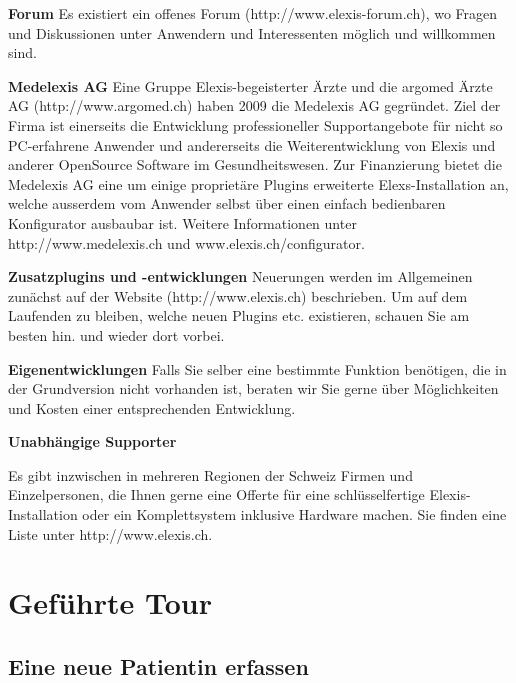 \documentclass[paper=a4,BCOR8.25mm,twoside]{scrbook}
\begin{document}
\bigskip

\textbf{Forum}
Es existiert ein offenes Forum (http://www.elexis-forum.ch), wo Fragen und Diskussionen unter Anwendern und Interessenten möglich und willkommen sind.

\bigskip

\textbf{Medelexis AG}
Eine Gruppe Elexis-begeisterter Ärzte und die argomed Ärzte AG (http://www.argomed.ch) haben 2009 die Medelexis AG gegründet. Ziel der Firma ist einerseits die Entwicklung professioneller Supportangebote für nicht so PC-erfahrene Anwender und andererseits die Weiterentwicklung von Elexis und anderer OpenSource Software im Gesundheitswesen. Zur Finanzierung bietet die Medelexis AG eine um einige proprietäre Plugins erweiterte Elexs-Installation an, welche ausserdem vom Anwender selbst über einen einfach bedienbaren Konfigurator ausbaubar ist. Weitere Informationen unter http://www.medelexis.ch und www.elexis.ch/configurator.  

\bigskip

\textbf{Zusatzplugins und -entwicklungen}
Neuerungen werden im Allgemeinen zunächst auf der Website (http://www.elexis.ch) beschrieben. Um auf dem Laufenden zu bleiben, welche neuen Plugins etc. existieren, schauen Sie am besten hin. und wieder dort vorbei.

\bigskip
{}
\textbf{Eigenentwicklungen}
Falls Sie selber eine bestimmte Funktion benötigen, die in der Grundversion nicht vorhanden ist, beraten wir Sie gerne über Möglichkeiten und Kosten einer entsprechenden Entwicklung.

\bigskip
\textbf{Unabhängige Supporter}

Es gibt inzwischen in mehreren Regionen der Schweiz Firmen und Einzelpersonen, die Ihnen gerne eine Offerte für eine schlüsselfertige Elexis-Installation oder ein Komplettsystem inklusive Hardware machen. Sie finden eine Liste unter http://www.elexis.ch.

\part{Geführte Tour}
\chapter{Eine neue Patientin erfassen}
\label{tour}
	
\end{document}
